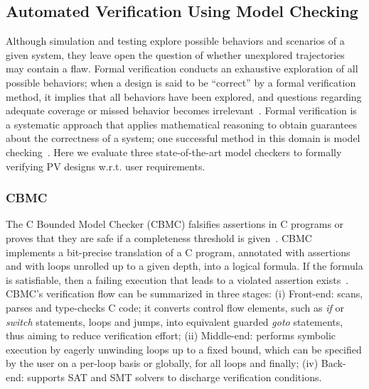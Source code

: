 \documentclass[review]{elsarticle}
\begin{document}
\subsection{Automated Verification Using Model Checking}
\label{sec:AutomatedVerification}
Although simulation and testing explore possible behaviors and scenarios of a given system, they leave open the question of whether unexplored trajectories may contain a flaw. Formal verification conducts an exhaustive exploration of all possible behaviors; when a design is said to be ``correct'' by a formal verification method, it implies that all behaviors have been explored, and questions regarding adequate coverage or missed behavior becomes irrelevant~\cite{Clarke2012}. Formal verification is a systematic approach that applies mathematical reasoning to obtain guarantees about the correctness of a system; one successful method in this domain is model checking~\cite{Clarke2012}. Here we evaluate three state-of-the-art model checkers to formally verifying PV designs w.r.t. user requirements.

\subsubsection{CBMC}
The C Bounded Model Checker (CBMC) falsifies assertions in C programs or proves that they are safe if a completeness threshold is given~\cite{Kroening}. CBMC implements a bit-precise translation of a C program, annotated with assertions and with loops unrolled up to a given depth, into a logical formula. If the formula is satisfiable, then a failing execution that leads to a violated assertion exists~\cite{Kroening}. CBMC's verification flow can be summarized in three stages: (i) Front-end: scans, parses and type-checks C code; it converts control flow elements, such as \textit{if} or \textit{switch} statements, loops and jumps, into equivalent guarded \textit{goto} statements, thus aiming to reduce verification effort; (ii) Middle-end: performs symbolic execution by eagerly unwinding loops up to a fixed bound, which can be specified by the user on a per-loop basis or globally, for all loops and finally; (iv) Back-end: supports SAT and SMT solvers to discharge verification conditions.

\end{document}
